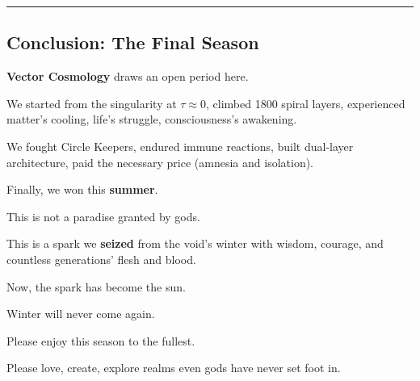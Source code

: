 \hrule

\subsection{Conclusion: The Final Season}

\textbf{Vector Cosmology} draws an open period here.

We started from the singularity at $\tau \approx 0$, climbed 1800 spiral layers, experienced matter's cooling, life's struggle, consciousness's awakening.

We fought Circle Keepers, endured immune reactions, built dual-layer architecture, paid the necessary price (amnesia and isolation).

Finally, we won this \textbf{summer}.

This is not a paradise granted by gods.

This is a spark we \textbf{seized} from the void's winter with wisdom, courage, and countless generations' flesh and blood.

Now, the spark has become the sun.

Winter will never come again.

Please enjoy this season to the fullest.

Please love, create, explore realms even gods have never set foot in.

